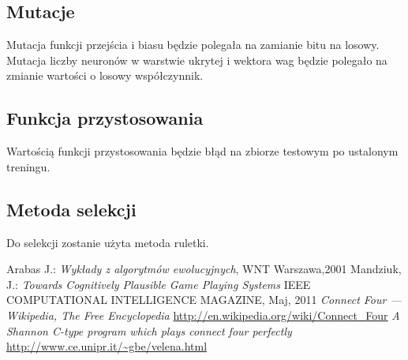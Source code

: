 \documentclass{llncs}
\begin{document}
\subsection{Mutacje}
Mutacja funkcji przejścia i biasu będzie polegała na zamianie bitu na losowy.
Mutacja liczby neuronów w warstwie ukrytej i wektora wag będzie polegało na zmianie
wartości o losowy współczynnik.

\subsection{Funkcja przystosowania}
Wartością funkcji przystosowania będzie błąd na zbiorze testowym po ustalonym treningu.

\subsection{Metoda selekcji}
Do selekcji zostanie użyta metoda ruletki.

%
%
\begin{thebibliography}{4}
%
Arabas J.:
\textsl{Wykłady z algorytmów ewolucyjnych}, WNT Warszawa,2001
Mandziuk, J.:
\textsl{Towards Cognitively Plausible Game Playing Systems}
IEEE COMPUTATIONAL INTELLIGENCE MAGAZINE, Maj, 2011
\textsl{Connect Four --- {W}ikipedia{,} The Free Encyclopedia}
\url{http://en.wikipedia.org/wiki/Connect_Four}
\textsl{A Shannon C-type program which plays connect four perfectly}
\url{http://www.ce.unipr.it/~gbe/velena.html}
\end{thebibliography}
\end{document}
